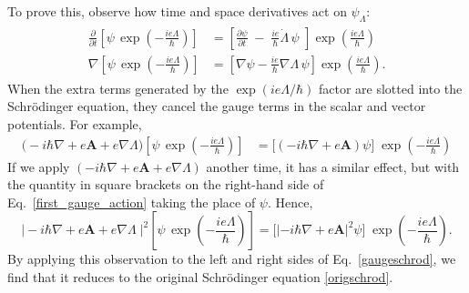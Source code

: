 \documentclass[prx,12pt]{revtex4-2}
\begin{document}
To prove this, observe how time and space derivatives act on $\psi_\Lambda$:
\begin{align}
  \begin{aligned}
    \frac{\partial}{\partial t} \left[\psi \, \exp\left(-\frac{ie\Lambda}{\hbar}\right)\right] &=
    \left[\frac{\partial\psi}{\partial t} \;-\; \frac{ie}{\hbar} \dot{\Lambda}\, \psi
      \,\, \right] \exp\left(\frac{ie\Lambda}{\hbar}\right)\\
    \nabla \left[\psi \, \exp\left(-\frac{ie\Lambda}{\hbar}\right)\right] &=
    \left[\nabla \psi - \frac{ie}{\hbar} \nabla \Lambda \,\psi \right] \exp\left(\frac{ie\Lambda}{\hbar}\right).
  \end{aligned}
\end{align}
When the extra terms generated by the $\exp(ie\Lambda/\hbar)$ factor
are slotted into the Schr\"odinger equation, they cancel the gauge
terms in the scalar and vector potentials.  For example,
\begin{align}
  \Big(-i\hbar\nabla + e\mathbf{A} + e\nabla\Lambda\Big)
  \left[\psi \, \exp\left(-\frac{ie\Lambda}{\hbar}\right)\right] &=
  \Big[\left(-i\hbar\nabla + e\mathbf{A}\right)\psi\Big]\;
  \exp\left(-\frac{ie\Lambda}{\hbar}\right)
  \label{first_gauge_action}
\end{align}
If we apply $(-i\hbar\nabla + e\mathbf{A} + e\nabla\Lambda)$ another
time, it has a similar effect, but with the quantity in square
brackets on the right-hand side of Eq.~\eqref{first_gauge_action}
taking the place of $\psi$.  Hence,
\begin{equation}
  \Big|-i\hbar\nabla + e\mathbf{A} + e\nabla\Lambda\;\Big|^2
  \left[\psi \, \exp\left(-\frac{ie\Lambda}{\hbar}\right)\right]  
  =   \Big[\left|-i\hbar\nabla + e\mathbf{A}\right|^2\psi\Big]\;
  \exp\left(-\frac{ie\Lambda}{\hbar}\right).
\end{equation}
By applying this observation to the left and right sides of
Eq.~\eqref{gaugeschrod}, we find that it reduces to the original
Schr\"odinger equation \eqref{origschrod}.
\end{document}
